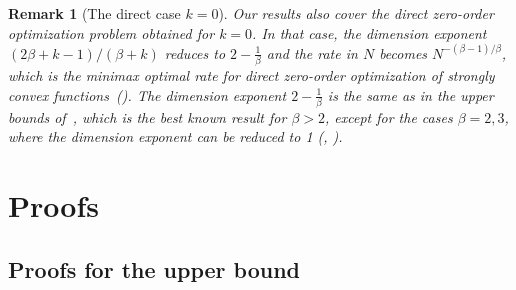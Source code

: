 \documentclass{article}
\newtheorem{remark}{Remark}[section]
\renewcommand{\leq}{\leqslant}
\renewcommand{\geq}{\geqslant}
\theoremstyle{definition}
\begin{document}
\begin{remark}[The direct case $k=0$]
\label{rem:k0-consistency}
Our results also cover the direct zero-order optimization problem obtained
for $k=0$. In that case, the dimension exponent $(2\beta+k-1)/(\beta+k)$
reduces to $2-\tfrac{1}{\beta}$ and the rate in $N$ becomes $N^{-(\beta-1)/\beta}$,
which is the minimax optimal rate for direct zero-order
optimization of strongly convex functions~(\cite{polyak1990optimal}). 
The dimension exponent
$2-\tfrac{1}{\beta}$ is the same as in the upper bounds of~\citet{akhavan2021distributed,novitskii2021improved}, which is the best known result for $\beta>2$, except for the cases $\beta=2,3$, where the dimension exponent can be reduced to 1  (\cite{akhavan2020exploiting}, \cite{yu2024stochastic}). %
\end{remark}







\section{Proofs}
\label{sec:proofs}

\subsection{Proofs for the upper bound}
\label{proofs-upper-bounds}
\end{document}

